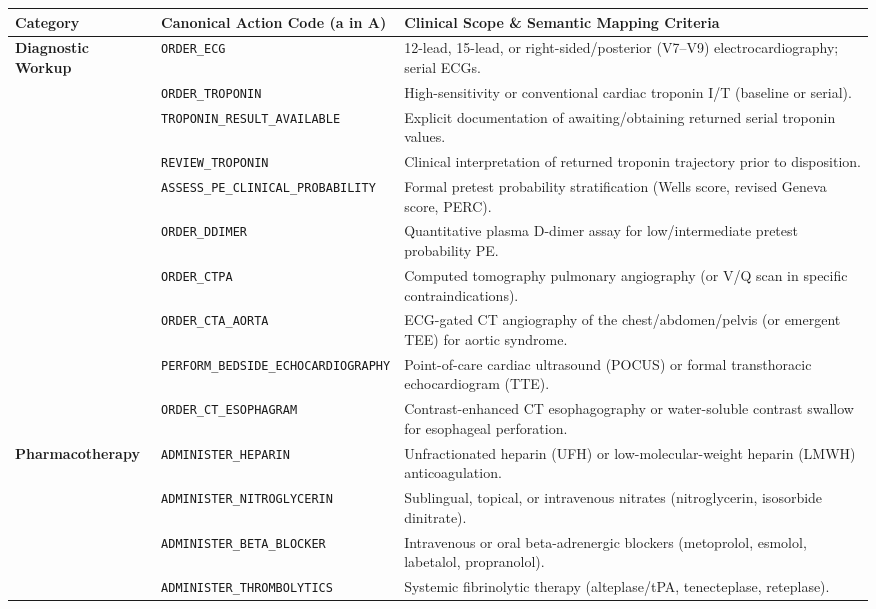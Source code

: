 \documentclass[10pt,a4paper]{article}
\begin{document}
{\scriptsize\setlength{\tabcolsep}{3.5pt}\begin{longtable}{p{}p{}p{}}
\toprule
Category & Canonical Action Code (a in A) & Clinical Scope \& Semantic Mapping Criteria \\
\midrule
\textbf{Diagnostic Workup} & \texttt{ORDER\_ECG} & 12-lead, 15-lead, or right-sided/posterior (V7--V9) electrocardiography; serial ECGs. \\
 & \texttt{ORDER\_TROPONIN} & High-sensitivity or conventional cardiac troponin I/T (baseline or serial). \\
 & \texttt{TROPONIN\_RESULT\_AVAILABLE} & Explicit documentation of awaiting/obtaining returned serial troponin values. \\
 & \texttt{REVIEW\_TROPONIN} & Clinical interpretation of returned troponin trajectory prior to disposition. \\
 & \texttt{ASSESS\_PE\_CLINICAL\_PROBABILITY} & Formal pretest probability stratification (Wells score, revised Geneva score, PERC). \\
 & \texttt{ORDER\_DDIMER} & Quantitative plasma D-dimer assay for low/intermediate pretest probability PE. \\
 & \texttt{ORDER\_CTPA} & Computed tomography pulmonary angiography (or V/Q scan in specific contraindications). \\
 & \texttt{ORDER\_CTA\_AORTA} & ECG-gated CT angiography of the chest/abdomen/pelvis (or emergent TEE) for aortic syndrome. \\
 & \texttt{PERFORM\_BEDSIDE\_ECHOCARDIOGRAPHY} & Point-of-care cardiac ultrasound (POCUS) or formal transthoracic echocardiogram (TTE). \\
 & \texttt{ORDER\_CT\_ESOPHAGRAM} & Contrast-enhanced CT esophagography or water-soluble contrast swallow for esophageal perforation. \\
\textbf{Pharmacotherapy} & \texttt{ADMINISTER\_HEPARIN} & Unfractionated heparin (UFH) or low-molecular-weight heparin (LMWH) anticoagulation. \\
 & \texttt{ADMINISTER\_NITROGLYCERIN} & Sublingual, topical, or intravenous nitrates (nitroglycerin, isosorbide dinitrate). \\
 & \texttt{ADMINISTER\_BETA\_BLOCKER} & Intravenous or oral beta-adrenergic blockers (metoprolol, esmolol, labetalol, propranolol). \\
 & \texttt{ADMINISTER\_THROMBOLYTICS} & Systemic fibrinolytic therapy (alteplase/tPA, tenecteplase, reteplase). \\

\end{longtable}}
\end{document}
